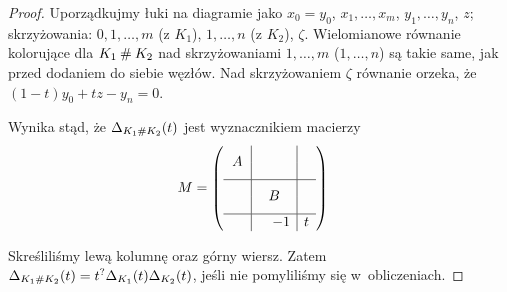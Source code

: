 \begin{proof}
\begin{comment}
            \strand[thick] (30, 10) [in=right, out=left] to (25, 10) to (10, -10);
            \strand[thick,latex-] (30, -10) [in=right, out=left] to (25, -10) to (10, 10);

            \node[darkblue] at (-50,10) [below] {$x_1,\ldots,x_{m-1}$};
            \node[red] at (-50,-10) [above] {$1,\ldots,m$};

            \node[darkblue] at (50,10) [below] {$y_1,\ldots,y_{n-1}$};
            \node[red] at (50,-10) [above] {$1,\ldots,n$};

            \node[darkblue] at (-20,-10)[below] {$x_m$};
            \node[darkblue] at (0, 10)[above] {$z$};
            \node[darkblue] at (25,-10)[below] {$y_n$};
            \node[darkblue] at (0, -10)[below] {$x_0 = y_0$};
            \node[red] at ( 20,  0)[right]{$0$};
            \node[red] at (-20,  0)[left]{$0$};
        \end{knot}
    \end{tikzpicture}\]
\end{comment}

    Uporządkujmy łuki na diagramie jako $x_0 = y_0$, $x_1, \ldots, x_m$, $y_1, \ldots, y_n$, $z$; skrzyżowania: $0, 1, \ldots, m$ (z $K_1$), $1, \ldots, n$ (z $K_2$), $\zeta$.
    Wielomianowe równanie kolorujące dla $K_1 \mathbin{\#} K_2$ nad skrzyżowaniami $1, \ldots, m$ ($1, \ldots, n$) są takie same, jak przed dodaniem do siebie węzłów.
    Nad skrzyżowaniem $\zeta$ równanie orzeka, że $(1-t)y_0+t z-y_n=0$.

    Wynika stąd, że $\Delta_{K_1 \mathbin{\#} K_2}(t)$ jest wyznacznikiem macierzy
    \begin{align*}
        M &= \left(\begin{array}{cc|cc|c}
            & & & & \\
            \multicolumn{2}{c|}{\smash{\raisebox{.5\normalbaselineskip}{$A$}}} & & \\
            \hline \\[-\normalbaselineskip]
            & & & & \\
            & & \multicolumn{2}{c|}{\smash{\raisebox{.5\normalbaselineskip}{$B$}}}\\ \hline
            & & & -1 & t
    \end{array}\right)
    \end{align*}

    Skreśliliśmy lewą kolumnę oraz górny wiersz.
    Zatem $\Delta_{K_1 \mathbin{\#} K_2}(t) = t^?\Delta_{K_1}(t) \Delta_{K_2}(t)$, jeśli nie pomyliliśmy się w~obliczeniach.
\end{proof}


